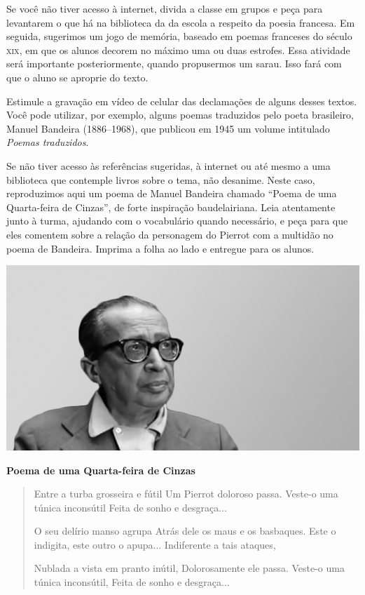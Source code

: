 \documentclass[12pt]{extarticle}
\begin{document}
Se você não tiver acesso à internet, divida a classe em grupos e 
peça para levantarem o que há na biblioteca da da escola a respeito da poesia 
francesa. Em seguida, sugerimos um jogo de memória, 
baseado em poemas franceses do século
\textsc{xix}, em que os alunos decorem no máximo uma ou duas estrofes. 
Essa atividade será importante posteriormente, 
quando propusermos um sarau. Isso fará com que o aluno se aproprie do texto.

Estimule a gravação em vídeo de celular das declamações
de alguns desses textos. Você pode utilizar, por exemplo, alguns poemas
traduzidos pelo poeta brasileiro, Manuel Bandeira (1886--1968), 
que publicou em 1945 um volume intitulado \textit{Poemas traduzidos}. 

Se não tiver acesso às referências sugeridas, à internet ou até mesmo a uma 
biblioteca que contemple livros sobre o tema, não desanime. 
Neste caso, reproduzimos aqui um poema de Manuel Bandeira chamado ``Poema de uma 
Quarta-feira de Cinzas'', de forte inspiração baudelairiana. Leia atentamente 
junto à turma, ajudando com o vocabulário quando necessário, e peça para 
que eles comentem sobre a relação da personagem do Pierrot com a multidão
no poema de Bandeira. Imprima a folha ao lado e entregue para os alunos.

\pagebreak
\includegraphics[width=.8\textwidth]{./images/PNLD0010-22}

\vspace{5mm}

\textbf{Poema de uma Quarta-feira de Cinzas}
\thispagestyle{empty}

\begin{verse}
Entre a turba grosseira e fútil
Um Pierrot doloroso passa.
Veste-o uma túnica inconsútil
Feita de sonho e desgraça...

O seu delírio manso agrupa
Atrás dele os maus e os basbaques.
Este o indigita, este outro o apupa...
Indiferente a tais ataques,

Nublada a vista em pranto inútil,
Dolorosamente ele passa.
Veste-o uma túnica inconsútil,
Feita de sonho e desgraça... 
\end{verse}
\end{document}

